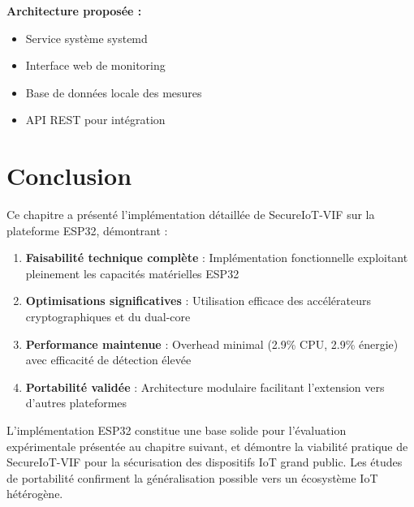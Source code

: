 \textbf{Architecture proposée :}
\begin{itemize}
    \item Service système systemd
    \item Interface web de monitoring
    \item Base de données locale des mesures
    \item API REST pour intégration
\end{itemize}

\section{Conclusion}

Ce chapitre a présenté l'implémentation détaillée de SecureIoT-VIF sur la plateforme ESP32, démontrant :

\begin{enumerate}
    \item \textbf{Faisabilité technique complète} : Implémentation fonctionnelle exploitant pleinement les capacités matérielles ESP32
    \item \textbf{Optimisations significatives} : Utilisation efficace des accélérateurs cryptographiques et du dual-core
    \item \textbf{Performance maintenue} : Overhead minimal (2.9\% CPU, 2.9\% énergie) avec efficacité de détection élevée
    \item \textbf{Portabilité validée} : Architecture modulaire facilitant l'extension vers d'autres plateformes
\end{enumerate}

L'implémentation ESP32 constitue une base solide pour l'évaluation expérimentale présentée au chapitre suivant, et démontre la viabilité pratique de SecureIoT-VIF pour la sécurisation des dispositifs IoT grand public. Les études de portabilité confirment la généralisation possible vers un écosystème IoT hétérogène.